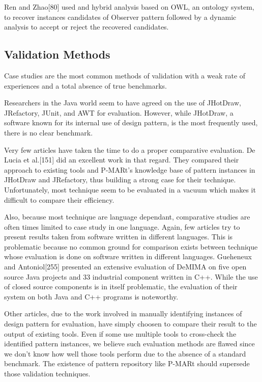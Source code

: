 \documentclass[letterpaper, 10 pt, conference]{ieeeconf}  %
\begin{document}
Ren and Zhao[80] used and hybrid analysis based on OWL, an ontology system,
to recover instances candidates of Observer pattern followed by a dynamic
analysis to accept or reject the recovered candidates.


\subsection{Validation Methods}

Case studies are the most common methods of validation with a weak rate of
experiences and a total absence of true benchmarks.

Researchers in the Java world seem to have agreed on the use of JHotDraw,
JRefactory, JUnit, and AWT for evaluation.
However, while JHotDraw, a software known for its internal use of design
pattern, is the most frequently used, there is no clear benchmark.

Very few articles have taken the time to do a proper comparative evaluation.
De Lucia et al.[151] did an excellent work in that regard.
They compared their approach to existing tools and P-MARt's knowledge base
of pattern instances in JHotDraw and JRefactory, thus building a
strong case for their technique.
Unfortunately, most technique seem to be evaluated in a vacuum which makes it
difficult to compare their efficiency.

Also, because most technique are language dependant, comparative studies are
often times limited to case study in one language.
Again, few articles try to present results taken from software written in
different languages.
This is problematic because no common ground for comparison exists between
technique whose evaluation is done on software written in different languages.
Gueheneux and Antoniol[255] presented an extensive evaluation of DeMIMA on
five open source Java projects and 33 industrial component written in C++.
While the use of closed source components is in itself problematic, the
evaluation of their system on both Java and C++ programs is noteworthy.

Other articles, due to the work involved in manually identifying instances of
design pattern for evaluation, have simply choosen to compare their result to
the output of existing tools.
Even if some use multiple tools to cross-check the identified pattern instances,
we believe such evaluation methods are flawed since we don't know how well
those tools perform due to the absence of a standard benchmark.
The existence of pattern repository like P-MARt should supersede those
validation techniques.
\end{document}
